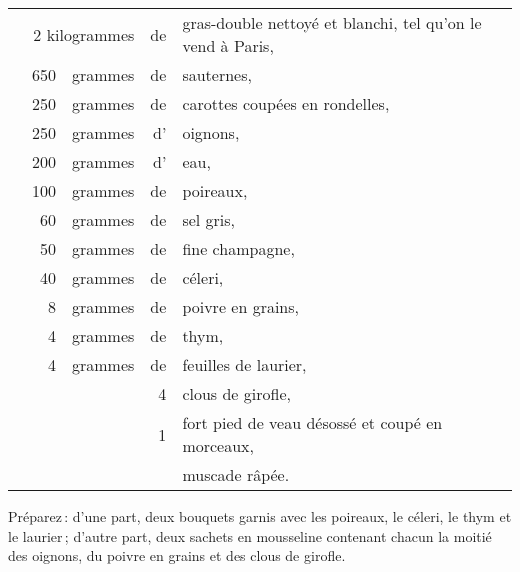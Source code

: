 \footnotesize
\begin{longtable}{rrrrp{18em}}
  & \multicolumn{2}{r}{2 kilogrammes} & de & gras-double nettoyé et blanchi, tel qu'on le vend à Paris,   \\
  & 650 & grammes & de & sauternes,                                                                       \\
  & 250 & grammes & de & carottes coupées en rondelles,                                                   \\
  & 250 & grammes & d' & oignons,                                                                         \\
  & 200 & grammes & d' & eau,                                                                             \\
  & 100 & grammes & de & poireaux,                                                                        \\
  &  60 & grammes & de & sel gris,                                                                        \\
  &  50 & grammes & de & fine champagne,                                                                  \\
  &  40 & grammes & de & céleri,                                                                          \\
  &   8 & grammes & de & poivre en grains,                                                                \\
  &   4 & grammes & de & thym,                                                                            \\
  &   4 & grammes & de & feuilles de laurier,                                                             \\
  &     &         &  4 & clous de girofle,                                                                \\
  &     &         &  1 & fort pied de veau désossé et coupé en morceaux,                                  \\
  &     &         &    & muscade râpée.                                                                   \\
\end{longtable}
\normalsize

Préparez : d’une part, deux bouquets garnis avec les poireaux, le céleri, le
thym et le laurier ; d'autre part, deux sachets en mousseline contenant chacun
la moitié des oignons, du poivre en grains et des clous de girofle.

